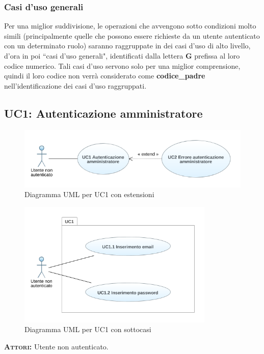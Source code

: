 \subsubsection{Casi d'uso generali}
Per una miglior suddivisione, le operazioni che avvengono sotto condizioni molto simili (principalmente quelle che possono essere richieste da un utente autenticato con un determinato ruolo) saranno raggruppate in dei casi d'uso di alto livello, d'ora in poi ``casi d'uso generali", identificati dalla lettera \textbf{G} prefissa al loro codice numerico. Tali casi d'uso servono solo per una miglior comprensione, quindi il loro codice non verrà considerato come \textbf{codice\_padre} nell'identificazione dei casi d'uso raggruppati.

\setlength{\parindent}{0cm}
\subsection{UC1: Autenticazione amministratore}
\label{sec:uc1}
\begin{figure}[h!]
    \centering
    \includegraphics[width=.8\textwidth]{figures/uc/uc1gen.png}
    \caption[Diagramma UML per UC1 con estensioni]{Diagramma UML per UC1 con estensioni
    \label{fig:uc1}}
\end{figure}   
\begin{figure}[h!]
    \centering
    \includegraphics[height=6cm]{figures/uc/uc1.png}
    \caption[Diagramma UML per UC1 con sottocasi]{Diagramma UML per UC1 con sottocasi
    \label{fig:uc1}}
\end{figure}   
\textsc{\textsc{\textbf{Attori:}}} Utente non autenticato.\\
